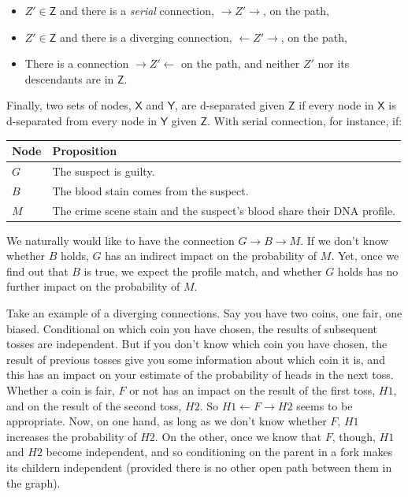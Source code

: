 \documentclass[
  10pt,
  dvipsnames,enabledeprecatedfontcommands]{scrartcl}
\begin{document}
\begin{itemize}

\item $Z' \in \mathsf{Z}$ and there is a \emph{serial} connection, $\rightarrow Z' \rightarrow$, on the path,
\item  $Z'\in \mathsf{Z}$ and there is a diverging connection, $\leftarrow Z' \rightarrow $, on the path,
\item There is a connection $\rightarrow Z' \leftarrow$ on the path, and neither $Z'$ nor its descendants are in $\mathsf{Z}$.
\end{itemize}

\vspace{1mm}

Finally, two sets of nodes, \(\mathsf{X}\) and \(\mathsf{Y}\), are
d-separated given \(\mathsf{Z}\) if every node in \(\mathsf{X}\) is
d-separated from every node in \(\mathsf{Y}\) given \(\mathsf{Z}\). With
serial connection, for instance, if:

\footnotesize 
\begin{center}
\begin{tabular}{@{}lp{4.3cm}@{}}\toprule
Node & Proposition \\ \midrule 
$G$ & The suspect is guilty. \\
$B$ & The blood stain comes from the suspect.\\
$M$ & The crime scene stain and the suspect's blood share their DNA profile.\\
\bottomrule
\end{tabular}
\end{center}
\normalsize

\noindent We naturally would like to have the connection
\(G \rightarrow B \rightarrow M\). If we don't know whether \(B\) holds,
\(G\) has an indirect impact on the probability of \(M\). Yet, once we
find out that \(B\) is true, we expect the profile match, and whether
\(G\) holds has no further impact on the probability of \(M\).

Take an example of a diverging connections. Say you have two coins, one
fair, one biased. Conditional on which coin you have chosen, the results
of subsequent tosses are independent. But if you don't know which coin
you have chosen, the result of previous tosses give you some information
about which coin it is, and this has an impact on your estimate of the
probability of heads in the next toss. Whether a coin is fair, \(F\) or
not has an impact on the result of the first toss, \(H1\), and on the
result of the second toss, \(H2\). So \(H1 \leftarrow F \rightarrow H2\)
seems to be appropriate. Now, on one hand, as long as we don't know
whether \(F\), \(H1\) increases the probability of \(H2\). On the other,
once we know that \(F\), though, \(H1\) and \(H2\) become independent,
and so conditioning on the parent in a fork makes its childern
independent (provided there is no other open path between them in the
graph).
\end{document}
